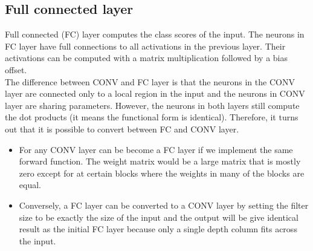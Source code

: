 \subsection{Full connected layer}
Full connected (FC) layer computes the class scores of the input. The neurons in FC layer have full connections to all activations in the previous layer. Their activations can be computed with a matrix multiplication followed by a bias offset.\\[0.2cm]
The difference between CONV and FC layer is that the neurons in the CONV layer are connected only to a local region in the input and the neurons in CONV layer are sharing parameters. However, the neurons in both layers still compute the dot products (it means the functional form is identical). Therefore, it turns out that it is possible to convert between FC and CONV layer.
\begin{itemize}
	\item For any CONV layer can be become a FC layer if we implement the same forward function. The weight matrix would be a large matrix that is mostly zero except for at certain blocks where the weights in many of the blocks are equal.
	\item Conversely, a FC layer can be converted to a CONV layer by setting the filter size to be exactly the size of the input and the output will be give identical result as the initial FC layer because only a single depth column fits across the input.
\end{itemize}
